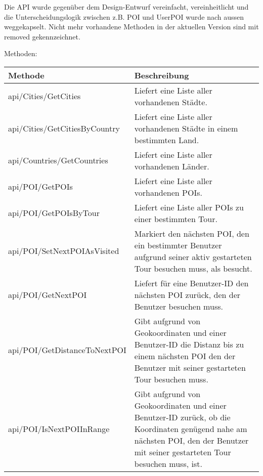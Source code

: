 Die API wurde gegenüber dem Design-Entwurf vereinfacht, vereinheitlicht und die Unterscheidungslogik zwischen z.B. POI und UserPOI wurde nach aussen weggekapselt.
Nicht mehr vorhandene Methoden in der aktuellen Version sind mit removed gekennzeichnet.

Methoden:

\begin{longtabu} to \textwidth { | l | X[l] | }
\hline
\textbf{Methode} & \textbf{Beschreibung} \\
\hline
\endhead

api/Cities/GetCities &
Liefert eine Liste aller vorhandenen St\"adte.\\\hline
api/Cities/GetCitiesByCountry &
Liefert eine Liste aller vorhandenen St\"adte in einem bestimmten Land.\\\hline
  api/Countries/GetCountries &
Liefert eine Liste aller vorhandenen L\"ander.\\\hline
api/POI/GetPOIs &
Liefert eine Liste aller vorhandenen POIs.\\\hline
api/POI/GetPOIsByTour &
Liefert eine Liste aller POIs zu einer bestimmten Tour.\\\hline
api/POI/SetNextPOIAsVisited &
Markiert den n\"achsten POI, den ein bestimmter Benutzer aufgrund seiner aktiv gestarteten
  Tour besuchen muss, als besucht.\\\hline
  api/POI/GetNextPOI &
Liefert f\"ur eine Benutzer-ID den n\"achsten POI zur\"uck, den der Benutzer besuchen
  muss.\\\hline
  api/POI/GetDistanceToNextPOI &
Gibt aufgrund von Geokoordinaten und einer Benutzer-ID die Distanz bis zu einem n\"achsten POI
  den der Benutzer mit seiner gestarteten Tour besuchen muss.\\\hline
api/POI/IsNextPOIInRange &
Gibt aufgrund von Geokoordinaten und einer Benutzer-ID zur\"uck, ob die Koordinaten gen\"ugend
  nahe am n\"achsten POI, den der Benutzer mit seiner gestarteten Tour besuchen muss, ist.


\end{longtabu}
